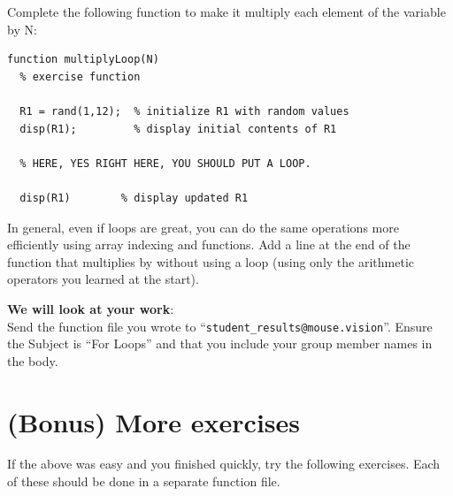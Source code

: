 \documentclass{article}
\begin{document}
Complete the following function to make it multiply each element of the variable  by N:
\begin{lstlisting}
function multiplyLoop(N)
  % exercise function

  R1 = rand(1,12);  % initialize R1 with random values
  disp(R1);         % display initial contents of R1

  % HERE, YES RIGHT HERE, YOU SHOULD PUT A LOOP.

  disp(R1)        % display updated R1
\end{lstlisting}

In general, even if loops are great, you can do the same operations more efficiently using array indexing and functions.
Add a line at the end of the function that multiplies  by  without using a loop (using only the arithmetic operators you learned at the start).


\textbf{We will look at your work}: \\
Send the function file you wrote to ``\verb|student_results@mouse.vision|''. 
Ensure the Subject is ``For Loops'' and that you include your group member names in the body.



\section{(Bonus) More exercises}

If the above was easy and you finished quickly, try the following exercises. 
Each of these should be done in a separate function file.
\end{document}
